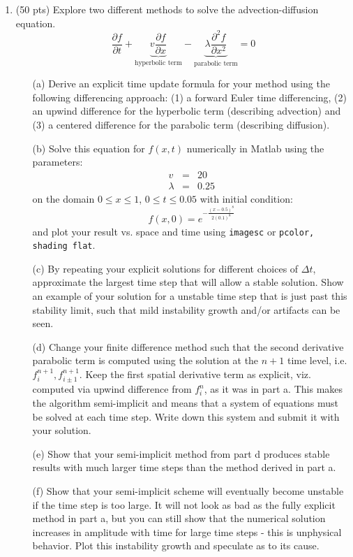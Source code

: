 \documentclass{article}
\begin{document}
\begin{enumerate}
    \item (50 pts) Explore two different methods to solve the advection-diffusion equation.
    \begin{equation}
      \frac{\partial f}{\partial t} + \underbrace{v \frac{\partial f}{\partial x}}_{\text{hyperbolic term}} - \underbrace{\lambda \frac{\partial^2 f}{\partial x^2}}_{\text{parabolic term}}=0
    \end{equation} 
    \begin{enumerate}
      \item[(a)]  Derive an explicit time update formula for your method using the following differencing approach:  (1) a forward Euler time differencing, (2) an upwind difference for the hyperbolic term (describing advection) and (3) a centered difference for the parabolic term (describing diffusion). 
      \item[(b)]  Solve this equation for $f(x,t)$ numerically in Matlab using the parameters:
      \begin{eqnarray}
        v &=& 20 \\
        \lambda &=& 0.25
      \end{eqnarray}
      on the domain $0 \le x \le 1$, $0 \le t \le 0.05$ with initial condition:
      \begin{equation}
        f(x,0)=e^{-\frac{(x-0.5)^8}{2(0.1)^8}}
      \end{equation}
      and plot your result vs. space and time using \texttt{imagesc} or \texttt{pcolor, shading flat}.  
      \item[(c)]  By repeating your explicit solutions for different choices of $\Delta t$, approximate the largest time step that will allow a stable solution.  Show an example of your solution for a unstable time step that is just past this stability limit, such that mild instability growth and/or artifacts can be seen.  
      \item[(d)]  Change your finite difference method such that the second derivative parabolic term is computed using the solution at the $n+1$ time level, i.e. $f_{i}^{n+1},f_{i\pm1}^{n+1}$.  Keep the first spatial derivative term as explicit, viz. computed via upwind difference from $f_i^n$, as it was in part a.  This makes the algorithm semi-implicit and means that a system of equations must be solved at each time step.  Write down this system and submit it with your solution.  
      \item[(e)]  Show that your semi-implicit method from part d produces stable results with much larger time steps than the method derived in part a.    
      \item[(f)]  Show that your semi-implicit scheme will eventually become unstable if the time step is too large.  It will not look as bad as the fully explicit method in part a, but you can still show that the numerical solution increases in amplitude with time for large time steps - this is unphysical behavior.  Plot this instability growth and speculate as to its cause.  
    \end{enumerate}
    
\end{enumerate}
\end{document}
